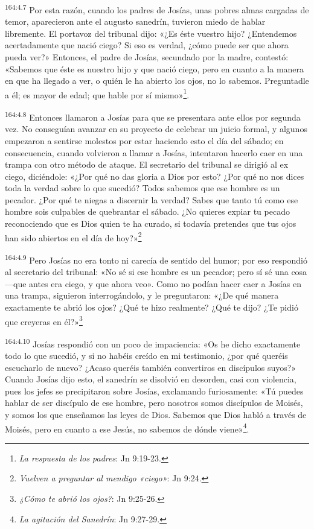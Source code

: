 \par 
\textsuperscript{164:4.7} Por esta razón, cuando los padres de Josías, unas pobres almas cargadas de temor, aparecieron ante el augusto sanedrín, tuvieron miedo de hablar libremente. El portavoz del tribunal dijo: «¿Es éste vuestro hijo? ¿Entendemos acertadamente que nació ciego? Si eso es verdad, ¿cómo puede ser que ahora pueda ver?» Entonces, el padre de Josías, secundado por la madre, contestó: «Sabemos que éste es nuestro hijo y que nació ciego, pero en cuanto a la manera en que ha llegado a ver, o quién le ha abierto los ojos, no lo sabemos. Preguntadle a él; es mayor de edad; que hable por sí mismo»\footnote{\textit{La respuesta de los padres}: Jn 9:19-23.}.

\par 
\textsuperscript{164:4.8} Entonces llamaron a Josías para que se presentara ante ellos por segunda vez. No conseguían avanzar en su proyecto de celebrar un juicio formal, y algunos empezaron a sentirse molestos por estar haciendo esto el día del sábado; en consecuencia, cuando volvieron a llamar a Josías, intentaron hacerlo caer en una trampa con otro método de ataque. El secretario del tribunal se dirigió al ex ciego, diciéndole: «¿Por qué no das gloria a Dios por esto? ¿Por qué no nos dices toda la verdad sobre lo que sucedió? Todos sabemos que ese hombre es un pecador. ¿Por qué te niegas a discernir la verdad? Sabes que tanto tú como ese hombre sois culpables de quebrantar el sábado. ¿No quieres expiar tu pecado reconociendo que es Dios quien te ha curado, si todavía pretendes que tus ojos han sido abiertos en el día de hoy?»\footnote{\textit{Vuelven a preguntar al mendigo «ciego»}: Jn 9:24.}

\par 
\textsuperscript{164:4.9} Pero Josías no era tonto ni carecía de sentido del humor; por eso respondió al secretario del tribunal: «No sé si ese hombre es un pecador; pero sí sé una cosa ---que antes era ciego, y que ahora veo». Como no podían hacer caer a Josías en una trampa, siguieron interrogándolo, y le preguntaron: «¿De qué manera exactamente te abrió los ojos? ¿Qué te hizo realmente? ¿Qué te dijo? ¿Te pidió que creyeras en él?»\footnote{\textit{¿Cómo te abrió los ojos?}: Jn 9:25-26.}

\par 
\textsuperscript{164:4.10} Josías respondió con un poco de impaciencia: «Os he dicho exactamente todo lo que sucedió, y si no habéis creído en mi testimonio, ¿por qué queréis escucharlo de nuevo? ¿Acaso queréis también convertiros en discípulos suyos?» Cuando Josías dijo esto, el sanedrín se disolvió en desorden, casi con violencia, pues los jefes se precipitaron sobre Josías, exclamando furiosamente: «Tú puedes hablar de ser discípulo de ese hombre, pero nosotros somos discípulos de Moisés, y somos los que enseñamos las leyes de Dios. Sabemos que Dios habló a través de Moisés, pero en cuanto a ese Jesús, no sabemos de dónde viene»\footnote{\textit{La agitación del Sanedrín}: Jn 9:27-29.}.

